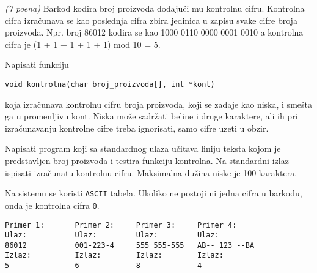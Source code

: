 \begin{Exercise}[label=v1.3_01] 
{\em (7 poena)}
Barkod kodira broj proizvoda dodajući mu kontrolnu cifru. Kontrolna
   cifra izračunava se kao poslednja cifra zbira jedinica u zapisu
   svake cifre broja proizvoda. Npr. broj 86012 kodira se kao 1000
   0110 0000 0001 0010 a kontrolna cifra je (1 + 1 + 1 + 1 + 1) mod 10
   = 5.

   Napisati funkciju 
   \begin{center} 
\begin{verbatim}
void kontrolna(char broj_proizvoda[], int *kont)   
\end{verbatim}
   \end{center} koja izračunava kontrolnu cifru broja proizvoda, koji
   se zadaje kao niska, i smešta ga u promenljivu kont. Niska može
   sadržati beline i druge karaktere, ali ih pri izračunavanju
   kontrolne cifre treba ignorisati, samo cifre uzeti u obzir.

   Napisati program koji sa standardnog ulaza učitava liniju teksta kojom je predstavljen broj proizvoda i testira funkciju kontrolna.
   Na standardni izlaz ispisati izračunatu kontrolnu cifru. Maksimalna dužina niske je 100 karaktera.

   Na sistemu se koristi {\tt ASCII} tabela. Ukoliko ne postoji ni jedna cifra u barkodu, onda je kontrolna cifra {\tt 0}.

\begin{center}
\begin{verbatim}
Primer 1:       Primer 2:     Primer 3:     Primer 4:  
Ulaz:           Ulaz:         Ulaz:         Ulaz:
86012           001-223-4     555 555-555   AB-- 123 --BA
Izlaz:          Izlaz:        Izlaz:        Izlaz:
5               6             8             4
\end{verbatim}
\end{center}
\end{Exercise}
\begin{Answer}[ref=v1.3_01]
\end{Answer}


